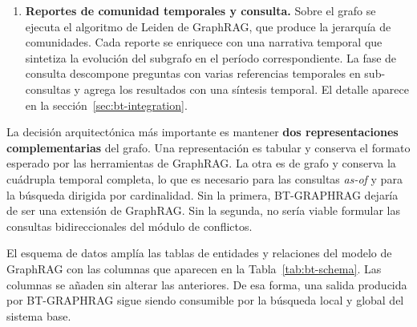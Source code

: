 \begin{enumerate}
    \item \textbf{Reportes de comunidad temporales y consulta.} Sobre el grafo se ejecuta el algoritmo de Leiden de GraphRAG, que produce la jerarquía de comunidades. Cada reporte se enriquece con una narrativa temporal que sintetiza la evolución del subgrafo en el período correspondiente. La fase de consulta descompone preguntas con varias referencias temporales en sub-consultas y agrega los resultados con una síntesis temporal. El detalle aparece en la sección~\ref{sec:bt-integration}.
\end{enumerate}


La decisión arquitectónica más importante es mantener \textbf{dos representaciones complementarias} del grafo. Una representación es tabular y conserva el formato esperado por las herramientas de GraphRAG. La otra es de grafo y conserva la cuádrupla temporal completa, lo que es necesario para las consultas \emph{as-of} y para la búsqueda dirigida por cardinalidad. Sin la primera, BT-GRAPHRAG dejaría de ser una extensión de GraphRAG. Sin la segunda, no sería viable formular las consultas bidireccionales del módulo de conflictos.

El esquema de datos amplía las tablas de entidades y relaciones del modelo de GraphRAG con las columnas que aparecen en la Tabla~\ref{tab:bt-schema}. Las columnas se añaden sin alterar las anteriores. De esa forma, una salida producida por BT-GRAPHRAG sigue siendo consumible por la búsqueda local y global del sistema base.

